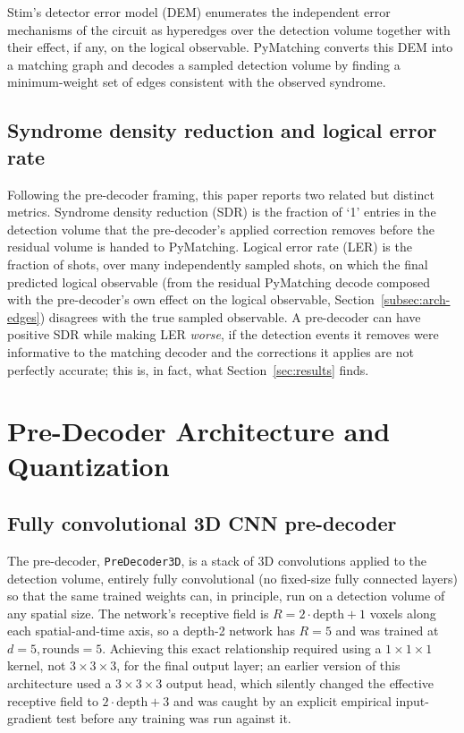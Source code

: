 \documentclass[pdflatex,sn-basic]{sn-jnl}
\begin{document}
Stim's detector error model (DEM) enumerates the independent error mechanisms of the circuit as hyperedges over the detection volume together with their effect, if any, on the logical observable. PyMatching converts this DEM into a matching graph and decodes a sampled detection volume by finding a minimum-weight set of edges consistent with the observed syndrome.

\subsection{Syndrome density reduction and logical error rate}\label{subsec:back-metrics}
Following the pre-decoder framing, this paper reports two related but distinct metrics. Syndrome density reduction (SDR) is the fraction of `1' entries in the detection volume that the pre-decoder's applied correction removes before the residual volume is handed to PyMatching. Logical error rate (LER) is the fraction of shots, over many independently sampled shots, on which the final predicted logical observable (from the residual PyMatching decode composed with the pre-decoder's own effect on the logical observable, Section~\ref{subsec:arch-edges}) disagrees with the true sampled observable. A pre-decoder can have positive SDR while making LER \emph{worse}, if the detection events it removes were informative to the matching decoder and the corrections it applies are not perfectly accurate; this is, in fact, what Section~\ref{sec:results} finds.

\section{Pre-Decoder Architecture and Quantization}\label{sec:architecture}

\subsection{Fully convolutional 3D CNN pre-decoder}\label{subsec:arch-predecoder}

The pre-decoder, \texttt{PreDecoder3D}, is a stack of 3D convolutions applied to the detection volume, entirely fully convolutional (no fixed-size fully connected layers) so that the same trained weights can, in principle, run on a detection volume of any spatial size. The network's receptive field is \(R = 2 \cdot \text{depth} + 1\) voxels along each spatial-and-time axis, so a depth-2 network has \(R=5\) and was trained at \(d=5, \text{rounds}=5\). Achieving this exact relationship required using a \(1\times1\times1\) kernel, not \(3\times3\times3\), for the final output layer; an earlier version of this architecture used a \(3\times3\times3\) output head, which silently changed the effective receptive field to \(2\cdot\text{depth}+3\) and was caught by an explicit empirical input-gradient test before any training was run against it.
\end{document}
